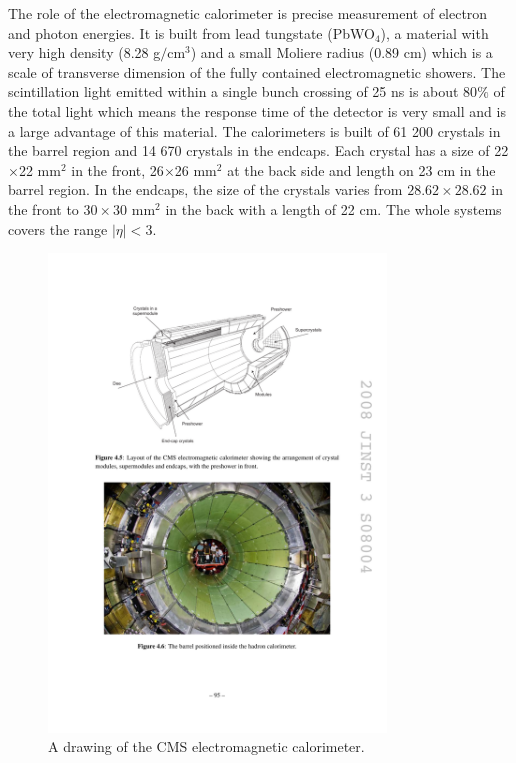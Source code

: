 The role of the electromagnetic calorimeter is precise measurement of electron and photon energies. It is built from lead tungstate (PbWO$_4$), a material with very high density (8.28 g$/$cm$^3$) and a small Moliere radius (0.89 cm) which is a scale of transverse dimension of the fully contained electromagnetic showers. The scintillation light emitted within a single bunch crossing of 25 ns is about 80$\%$ of the total light which means the response time of the detector is very small and is a large advantage of this material. The calorimeters is built of 61 200 crystals in the barrel region and 14 670 crystals in the endcaps. Each crystal has a size of 22$\times $22 mm$^2$ in the front, 26$\times$26 mm$^2$ at the back side and length on 23 cm in the barrel region. In the endcaps, the size of the crystals varies from $28.62\times 28.62$ in the front to $30\times 30$ mm$^2$ in the back with a length of 22 cm. The whole systems covers the range $|\eta|<3$.
\begin{figure}[htbp]
	\centering
		\includegraphics[width=0.8\textwidth]{Figures/ECAL.pdf}
	\caption[CMS Electromagnetic Calorimeter]{A drawing of the CMS electromagnetic calorimeter. \cite{Chatrchyan:2008aa}}
	\label{fig:ECAL}
\end{figure}
